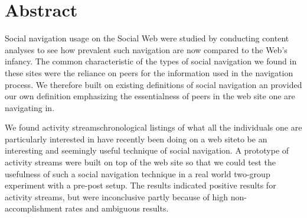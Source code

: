 \chapter{Abstract}

Social navigation usage on the Social Web were studied by conducting content
analyses to see how prevalent such navigation are now compared to the Web's
infancy. The common characteristic of the types of social navigation we found
in these sites were the reliance on peers for the information used in the
navigation process. We therefore built on existing definitions of social
navigation an provided our own definition emphasizing the essentialness of
peers in the web site one are navigating in.

We found activity streams\dash{}chronological listings of what
all the individuals one are particularly interested in have recently been
doing on a web site\dash{}to be an interesting and seemingly useful technique
of social navigation. A prototype of activity streams were built on top of the
\urort{} web site so that we could test the usefulness of such a social
navigation technique in a real world two-group experiment with a pre-post
setup. The results indicated positive results for activity streams, but were
inconclusive partly because of high non-accomplishment
rates and ambiguous results.
